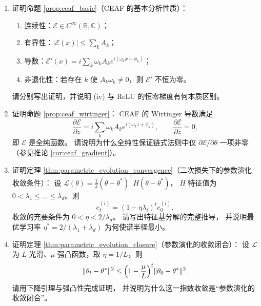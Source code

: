 \begin{enumerate}[leftmargin=3em, label=\textbf{题 \arabic*}]
    \item 证明命题 \ref{prop:ceaf_basic}（CEAF 的基本分析性质）：
    \begin{enumerate}[label=(\roman*)]
        \item 连续性：$\mathcal{E}\in C^\infty(\mathbb{R},\mathbb{C})$；
        \item 有界性：$|\mathcal{E}(x)|\le\sum_kA_k$；
        \item 导数：$\mathcal{E}'(x)=i\sum_k\omega_kA_ke^{i(\omega_kx+\phi_k)}$；
        \item 非退化性：若存在 $k$ 使 $A_k\omega_k\neq0$，则 $\mathcal{E}'$ 不恒为零。
    \end{enumerate}
    请分别写出证明，并说明 (iv) 与 ReLU 的恒零梯度有何本质区别。

    \item 证明命题 \ref{prop:ceaf_wirtinger}：
    CEAF 的 Wirtinger 导数满足
    \[
    \frac{\partial\mathcal{E}}{\partial z}
    =i\sum_k\omega_kA_ke^{i(\omega_kz+\phi_k)},\qquad
    \frac{\partial\mathcal{E}}{\partial\bar{z}}=0,
    \]
    即 $\mathcal{E}$ 是全纯函数。
    请说明为什么全纯性保证链式法则中仅 $\partial\mathcal{E}/\partial\theta$ 一项非零
    （参见推论 \ref{cor:ceaf_gradient}）。

    \item 证明定理 \ref{thm:parametric_evolution_convergence}（二次损失下的参数演化收敛条件）：
    设 $\mathcal{L}(\theta)=\frac12(\theta-\theta^*)^{\mathsf T}H(\theta-\theta^*)$，
    $H$ 特征值为 $0<\lambda_1\le\dots\le\lambda_d$。则
    \[
    e_t^{(i)}=(1-\eta\lambda_i)^te_0^{(i)},
    \]
    收敛的充要条件为 $0<\eta<2/\lambda_d$。
    请写出特征基分解的完整推导，
    并说明最优学习率 $\eta^*=2/(\lambda_1+\lambda_d)$ 为何使谱半径最小。

    \item 证明定理 \ref{thm:parametric_evolution_closure}（参数演化的收敛闭合）：
    设 $\mathcal{L}$ 为 $L$-光滑、$\mu$-强凸函数，取 $\eta=1/L$，则
    \[
    \|\theta_t-\theta^*\|^2
    \le\Bigl(1-\frac{\mu}{L}\Bigr)^t\|\theta_0-\theta^*\|^2.
    \]
    请用下降引理与强凸性完成证明，
    并说明为什么这一指数收敛是“参数演化的收敛闭合”。


\end{enumerate}
